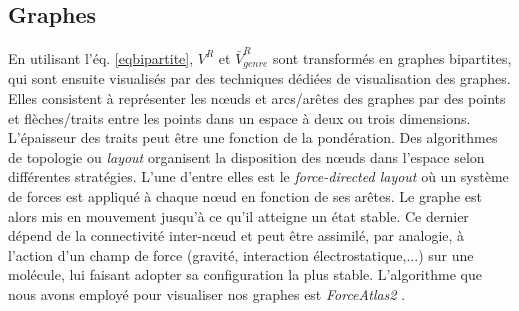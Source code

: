  \subsection{Graphes}
	En utilisant l'éq. \ref{eqbipartite}, $V^{R}$ et $\bar{V}_{genre}^{R}$ sont transformés en graphes bipartites, qui sont ensuite visualisés par des techniques dédiées de visualisation des graphes. Elles consistent à représenter les nœuds et arcs/arêtes des graphes par des points et flèches/traits entre les points dans un espace à deux ou trois dimensions. L’épaisseur des traits peut être une fonction de la pondération. Des algorithmes de topologie ou \textit{layout} organisent la  disposition des nœuds dans l'espace selon différentes stratégies. L’une d’entre elles est le \textit{force-directed layout} où un système de forces est appliqué à chaque nœud en fonction de ses arêtes. Le graphe est alors mis en mouvement jusqu'à ce qu'il atteigne un état stable. Ce  dernier dépend de la connectivité inter-nœud et peut être assimilé, par analogie, à l'action d'un champ de force (gravité, interaction électrostatique,...) sur une molécule, lui faisant adopter sa configuration la plus stable. L'algorithme que nous avons employé pour visualiser nos graphes est \textit{ForceAtlas2} \citep{jacomy2011forceatlas2}.
		

